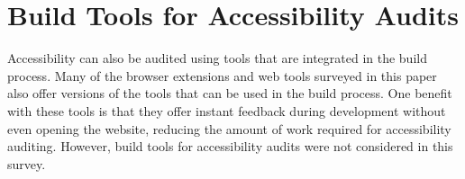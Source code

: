 
\chapter{Build Tools for Accessibility Audits}
\label{chap:Intro}

Accessibility can also be audited using tools that are integrated in the build
process.
Many of the browser extensions and web tools surveyed in this paper also offer
versions of the tools that can be used in the build process.
One benefit with these tools is that they offer instant feedback during development
without even opening the website, reducing the amount of work required for accessibility
auditing.
However, build tools for accessibility audits were not considered in this survey.
